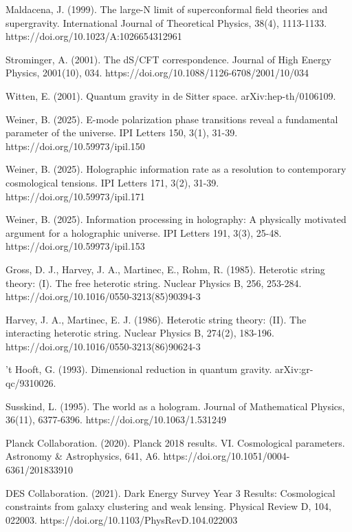 \documentclass[11pt,english,twoside]{article}
\theoremstyle{plain}
\theoremstyle{definition}
\theoremstyle{remark}
\begin{document}
\begin{thebibliography}{99}
{\scriptsize

 Maldacena, J. (1999). The large-N limit of superconformal field theories and supergravity. International Journal of Theoretical Physics, 38(4), 1113-1133. https://doi.org/10.1023/A:1026654312961

 Strominger, A. (2001). The dS/CFT correspondence. Journal of High Energy Physics, 2001(10), 034. https://doi.org/10.1088/1126-6708/2001/10/034

 Witten, E. (2001). Quantum gravity in de Sitter space. arXiv:hep-th/0106109.

 Weiner, B. (2025). E-mode polarization phase transitions reveal a fundamental parameter of the universe. IPI Letters 150, 3(1), 31-39. https://doi.org/10.59973/ipil.150

 Weiner, B. (2025). Holographic information rate as a resolution to contemporary cosmological tensions. IPI Letters 171, 3(2), 31-39. https://doi.org/10.59973/ipil.171

 Weiner, B. (2025). Information processing in holography: A physically motivated argument for a holographic universe. IPI Letters 191, 3(3), 25-48. https://doi.org/10.59973/ipil.153

 Gross, D. J., Harvey, J. A., Martinec, E., Rohm, R. (1985). Heterotic string theory: (I). The free heterotic string. Nuclear Physics B, 256, 253-284. https://doi.org/10.1016/0550-3213(85)90394-3

 Harvey, J. A., Martinec, E. J. (1986). Heterotic string theory: (II). The interacting heterotic string. Nuclear Physics B, 274(2), 183-196. https://doi.org/10.1016/0550-3213(86)90624-3

 't Hooft, G. (1993). Dimensional reduction in quantum gravity. arXiv:gr-qc/9310026.

 Susskind, L. (1995). The world as a hologram. Journal of Mathematical Physics, 36(11), 6377-6396. https://doi.org/10.1063/1.531249

 Planck Collaboration. (2020). Planck 2018 results. VI. Cosmological parameters. Astronomy \& Astrophysics, 641, A6. https://doi.org/10.1051/0004-6361/201833910

 DES Collaboration. (2021). Dark Energy Survey Year 3 Results: Cosmological constraints from galaxy clustering and weak lensing. Physical Review D, 104, 022003. https://doi.org/10.1103/PhysRevD.104.022003

}
\end{thebibliography}
\end{document}
